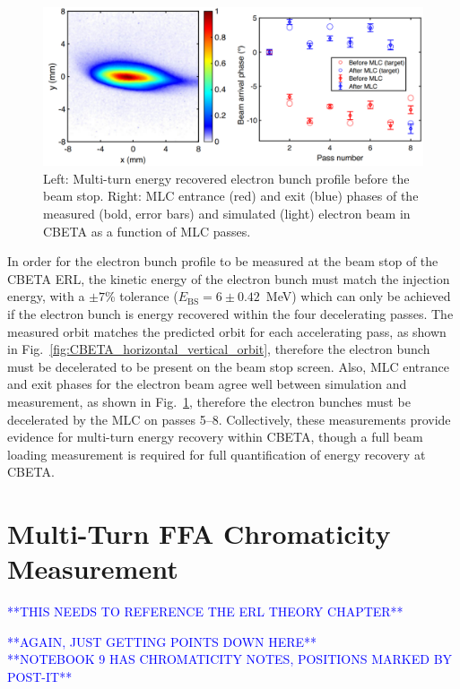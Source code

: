 \documentclass[../main.tex]{subfiles}
\begin{document}
\begin{figure}[!h]
\centering
\includegraphics[width=\textwidth]{Figures/CBETA_Multi-Pass_Commissioning/dump_beam_phases.pdf}
\caption{Left: Multi-turn energy recovered electron bunch profile before the beam stop. Right: MLC entrance (red) and exit (blue) phases of the measured (bold, error bars) and simulated (light) electron beam in CBETA as a function of MLC passes.}
\label{fig:CBETA_phases_dump_bunch}
\end{figure}

In order for the electron bunch profile to be measured at the beam stop of the CBETA ERL, the kinetic energy of the electron bunch must match the injection energy, with a $\pm 7$\% tolerance ($E_{\mathrm{BS}} = 6\pm 0.42$~\si{\mega\electronvolt}) which can only be achieved if the electron bunch is energy recovered within the four decelerating passes. The measured orbit matches the predicted orbit for each accelerating pass, as shown in Fig.~\ref{fig:CBETA_horizontal_vertical_orbit}, therefore the electron bunch must be decelerated to be present on the beam stop screen. Also, MLC entrance and exit phases for the electron beam agree well between simulation and measurement, as shown in Fig.~\ref{fig:CBETA_phases_dump_bunch}, therefore the electron bunches must be decelerated by the MLC on passes 5--8. Collectively, these measurements provide evidence for multi-turn energy recovery within CBETA, though a full beam loading measurement is required for full quantification of energy recovery at CBETA.

\section{Multi-Turn FFA Chromaticity Measurement}
\textcolor{blue}{**THIS NEEDS TO REFERENCE THE ERL THEORY CHAPTER**}

\textcolor{blue}{**AGAIN, JUST GETTING POINTS DOWN HERE** \\ **NOTEBOOK 9 HAS CHROMATICITY NOTES, POSITIONS MARKED BY POST-IT**}
\end{document}
